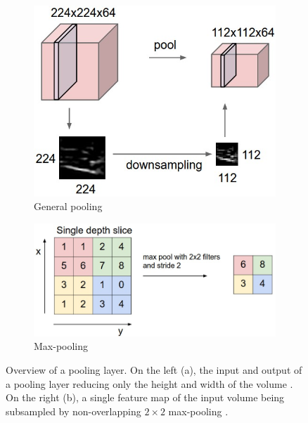 \begin{figure}[t]
  \begin{subfigure}[b]{0.35\textwidth}
    \includegraphics[width=\textwidth]{gfx/pool}
    \caption{General pooling}
    \label{fig:sec:theory:convnets:pooling:general}
  \end{subfigure}
  \hfill
  \begin{subfigure}[b]{0.55\textwidth}
    \includegraphics[width=\textwidth]{gfx/maxpool}
    \caption{Max-pooling}
    \label{fig:sec:theory:convnets:pooling:max}
  \end{subfigure}
  \caption{
    Overview of a pooling layer.
    On the left (a), the input and output of a pooling layer reducing only the height and width of the volume \cite{Karpathy}.
    On the right (b), a single feature map of the input volume being subsampled by non-overlapping ${2}\times{2}$ max-pooling \cite{Karpathya}.
  }
  \label{fig:sec:theory:convnets:pooling}
\end{figure}



